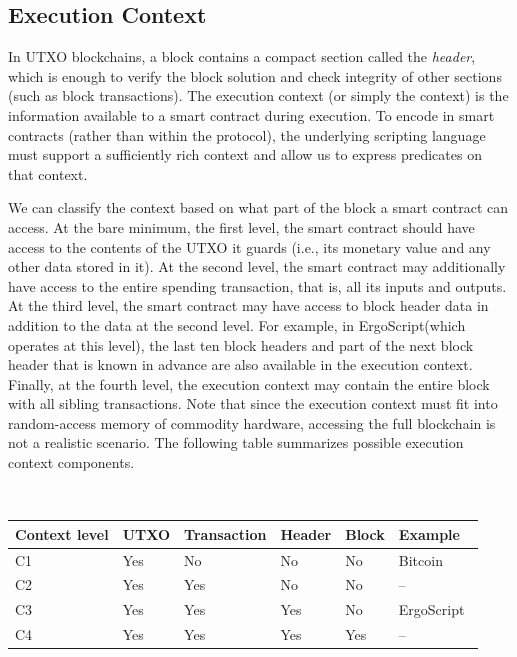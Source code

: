 \documentclass[11pt]{article}
\newcommand{\langname}{ErgoScript\xspace}
\begin{document}
\subsection{Execution Context}
\label{context}

In UTXO blockchains, a block contains a compact section called the {\em header}, which is
enough to verify the block solution and check integrity of other sections (such as block transactions). 
The execution context (or simply the context) is the information available to a smart contract during execution. 
To encode \algname in smart contracts (rather than within the protocol), the underlying scripting language must support  a sufficiently rich context and allow us to express predicates on that context.

We can classify the context based on what part of the block a smart contract can access. At the bare minimum, the first level, the smart contract should have access to the contents of the UTXO it guards (i.e., its monetary value and any other data stored in it). At the second level, the smart contract may additionally have access to the entire spending transaction, that is, all its inputs and outputs. At the third level, the smart contract may have access to block header data in addition to the data at the second level. For example, in \langname (which operates at this level), the last ten block headers and part of the next block header that is known in advance are also available in the execution context. Finally, at the fourth level, the execution context may contain the entire block with all sibling transactions. Note that since the execution context must fit into random-access memory of commodity hardware, accessing the full blockchain is not a realistic scenario. The following
 table summarizes possible execution context components.

~\\
\begin{tabular}{|l|l|l|l|l|l|}\hline
	Context level & UTXO & Transaction & Header      & Block & Example \\ \hline
	 C1     & Yes  & No          & No  		   & No    & Bitcoin~\cite{Nak08} \\
	 C2     & Yes & Yes         & No 		   & No    & -- \\
	 C3     & Yes & Yes         & Yes 		   & No    & \langname ~\cite{ergo}   \\
	 C4     & Yes & Yes         & Yes 		   & Yes   & --    \\\hline
\end{tabular}
\end{document}
